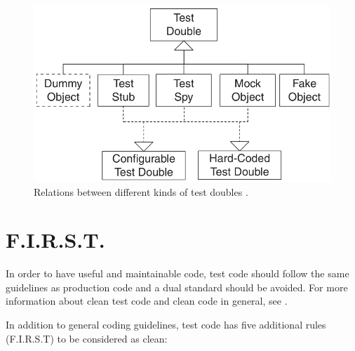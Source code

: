         \begin{figure}[hbtp]
            \centering
            \includegraphics[width=\columnwidth]{img/testDoubles.png}
            \caption{Relations between different kinds of test doubles \cite[p.~527]{Meszaros:2006:XTP:1076526}.}
            \label{fig:TestDoubleRelations}
        \end{figure}




\section{F.I.R.S.T.} \label{sec:First}

    In order to have useful and maintainable code, test code should follow the same guidelines as production code
    and a dual standard should be avoided. 
    For more information about clean test code and clean code in general, see \cite[]{Martin:2008:CCH:1388398}.

    In addition to general coding guidelines, test code has five additional rules (F.I.R.S.T) to be considered as clean:

